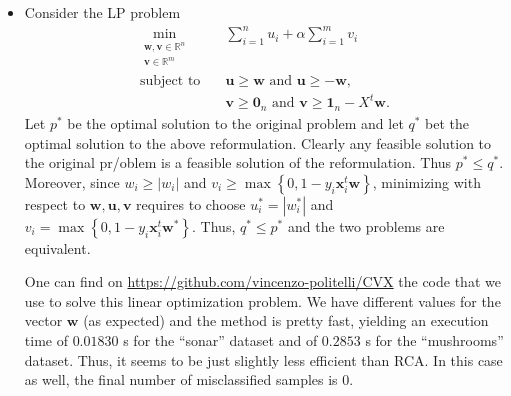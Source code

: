 \documentclass{article}
\begin{document}
\begin{itemize}
       \item Consider the LP problem
           \begin{align*}
               \min_{\substack{\mathbf{w}, \mathbf{v} \in \mathbb{R}^{n} \\
               \mathbf{v} \in \mathbb{R}^{m}}} \quad & 
               \sum_{i = 1}^{n}u_{i} + \alpha \sum_{i = 1}^{m}v_{i} \\
               \text{subject to} \quad & \mathbf{u} \geq \mathbf{w} \text{  and  } \mathbf{u} \geq -\mathbf{w}, \\
                                       & \mathbf{v} \geq \mathbf{0}_{n} \text{  and  } \mathbf{v} \geq \mathbf{1}_{n} - 
                                X^{t}\mathbf{w}.
           \end{align*}
           Let $p^{*}$ be the optimal solution
           to the original problem and let 
           $q^{*}$ bet the optimal solution to 
           the above reformulation. Clearly 
           any feasible solution to the original
           pr/oblem is a feasible solution
           of the reformulation.
           Thus  $p^{*} \leq q^{*}$.
           Moreover, since $w_{i} \geq \left|w_{i}\right|$
           and $v_{i} \geq \max \left\{0, 1 - y_{i}\mathbf{x}_{i}^{t}\mathbf{w}\right\}$,
           minimizing with respect to $\mathbf{w}, \mathbf{u}, \mathbf{v}$
           requires to choose $u_{i}^{*} = \left|w_{i}^{*}\right|$ 
           and $v_{i} = \max \left\{0, 1 - y_{i}\mathbf{x}_{i}^{t} \mathbf{w}^{*}\right\}$.
           Thus, $q^{*} \leq p^{*}$ and the two
           problems are equivalent.
           
           One can find on \url{https://github.com/vincenzo-politelli/CVX}
           the code that we use to solve this linear
           optimization problem. We have different
           values for the vector $\mathbf{w}$ (as 
           expected) and the method is 
           pretty fast, yielding an execution
           time of $0.01830$ s for the ``sonar''
           dataset and of $0.2853$ s for
           the ``mushrooms'' dataset.
           Thus, it seems to be just slightly less
           efficient than RCA.
           In this case as well, the final number
           of misclassified samples is $0$.


\end{itemize}
\end{document}
